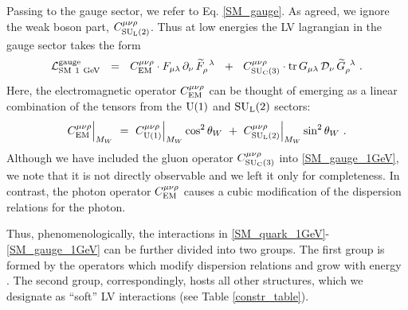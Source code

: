 \documentclass[12pt,preprintnumbers,nofootinbib]{revtex4}
\newcommand{\wt}{\widetilde}
\newcommand{\suc}{{{\rm SU}_{\rm C}(3)}}
\newcommand{\sul}{{{\rm SU}_{\rm L}(2)}}
\newcommand{\ue}{{{\rm U}(1)}}
\newcommand{\el}{{\rm EM}}
\begin{document}
	Passing to the gauge sector, we refer to Eq. \eqref{SM_gauge}.
	As agreed, we ignore the weak boson part, $ C_{\sul}^{\mu\nu\rho} $.
	Thus at low energies the LV lagrangian in the gauge sector
	takes the form
\begin{equation}
\label{SM_gauge_1GeV}
	\mathcal{L}_{\rm SM\ 1~GeV}^{\rm gauge} ~~=~~
	C^{\mu\nu\rho}_\el \cdot 
	F_{\mu\lambda}\, \partial_\nu\, \wt{F}_\rho^{\phantom{\rho}\lambda}
	~~+~~
	C_{\suc}^{\mu\nu\rho} \cdot 
	{\rm tr}\,
	G_{\mu\lambda}\, \mathcal{D}_\nu\, \wt{G}_\rho^{\phantom{\rho}\lambda}
	~.
\end{equation}
	Here, the electromagnetic operator
$ C^{\mu\nu\rho}_\el $
	can be thought of emerging as a linear combination of the 
	tensors from the $ \ue $ and $ \sul $ sectors:
\[
	C^{\mu\nu\rho}_\el\Bigr|_{M_W} ~=~ 
		C^{\mu\nu\rho}_{\ue}\Bigr|_{M_W} \cos^2 \theta_W ~+~ 
		C^{\mu\nu\rho}_{\sul}\Bigr|_{M_W} \sin^2 \theta_W~.
\]
	Although we have included the gluon operator $ C_{\suc}^{\mu\nu\rho} $
	into \eqref{SM_gauge_1GeV}, we note 
	that it is not directly observable and we left it only for completeness.
	In contrast, the photon operator $ C^{\mu\nu\rho}_\el $ causes a
	cubic modification of the dispersion relations for the photon.


	Thus, phenomenologically, the interactions in \eqref{SM_quark_1GeV}-\eqref{SM_gauge_1GeV} 
	can be further divided into two groups.
	The first group is formed by the operators which modify dispersion relations
	and grow with energy 
\cite{MP:}.
	The second group, correspondingly, hosts all other
	structures, which we designate as ``soft'' LV interactions  
	(see Table \ref{constr_table}).
\end{document}
